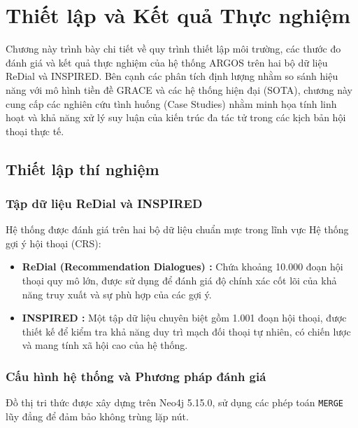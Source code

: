 \chapter{Thiết lập và Kết quả Thực nghiệm}\label{chap:experiments}

Chương này trình bày chi tiết về quy trình thiết lập môi trường, các thước đo đánh giá và kết quả thực nghiệm của hệ thống ARGOS trên hai bộ dữ liệu ReDial và INSPIRED. Bên cạnh các phân tích định lượng nhằm so sánh hiệu năng với mô hình tiền đề GRACE và các hệ thống hiện đại (SOTA), chương này cung cấp các nghiên cứu tình huống (Case Studies) nhằm minh họa tính linh hoạt và khả năng xử lý suy luận của kiến trúc đa tác tử trong các kịch bản hội thoại thực tế.

\section{Thiết lập thí nghiệm}

\subsection{Tập dữ liệu ReDial và INSPIRED}
Hệ thống được đánh giá trên hai bộ dữ liệu chuẩn mực trong lĩnh vực Hệ thống gợi ý hội thoại (CRS):
\begin{itemize}
    \item \textbf{ReDial (Recommendation Dialogues) \cite{li2018towards}:} Chứa khoảng 10.000 đoạn hội thoại quy mô lớn, được sử dụng để đánh giá độ chính xác cốt lõi của khả năng truy xuất và sự phù hợp của các gợi ý.
    \item \textbf{INSPIRED \cite{hayati-etal-2020-inspired}:} Một tập dữ liệu chuyên biệt gồm 1.001 đoạn hội thoại, được thiết kế để kiểm tra khả năng duy trì mạch đối thoại tự nhiên, có chiến lược và mang tính xã hội cao của hệ thống.
\end{itemize}

\subsection{Cấu hình hệ thống và Phương pháp đánh giá}

Đồ thị tri thức được xây dựng trên Neo4j 5.15.0, sử dụng các phép toán \texttt{MERGE} lũy đẳng để đảm bảo không trùng lặp nút.

